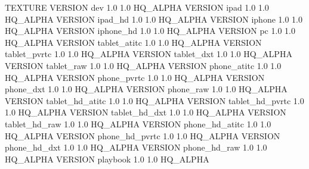 TEXTURE
{
	VERSION dev				1.0 1.0		HQ_ALPHA
	VERSION ipad			1.0 1.0 	HQ_ALPHA
	VERSION ipad_hd			1.0 1.0 	HQ_ALPHA
	VERSION iphone 			1.0 1.0 	HQ_ALPHA
	VERSION iphone_hd		1.0 1.0		HQ_ALPHA
	VERSION pc 				1.0 1.0 	HQ_ALPHA
	VERSION tablet_atitc	1.0	1.0		HQ_ALPHA
	VERSION tablet_pvrtc	1.0	1.0		HQ_ALPHA
	VERSION tablet_dxt		1.0	1.0		HQ_ALPHA
	VERSION tablet_raw		1.0	1.0		HQ_ALPHA
	VERSION phone_atitc		1.0	1.0		HQ_ALPHA
	VERSION phone_pvrtc		1.0	1.0		HQ_ALPHA
	VERSION phone_dxt		1.0	1.0		HQ_ALPHA
	VERSION phone_raw		1.0	1.0		HQ_ALPHA
	VERSION tablet_hd_atitc	1.0	1.0		HQ_ALPHA
	VERSION tablet_hd_pvrtc	1.0	1.0		HQ_ALPHA
	VERSION tablet_hd_dxt	1.0	1.0		HQ_ALPHA
	VERSION tablet_hd_raw	1.0	1.0		HQ_ALPHA
	VERSION phone_hd_atitc	1.0	1.0		HQ_ALPHA
	VERSION phone_hd_pvrtc	1.0	1.0		HQ_ALPHA
	VERSION phone_hd_dxt	1.0	1.0		HQ_ALPHA
	VERSION phone_hd_raw	1.0	1.0		HQ_ALPHA
	VERSION playbook		1.0 1.0 	HQ_ALPHA
}
